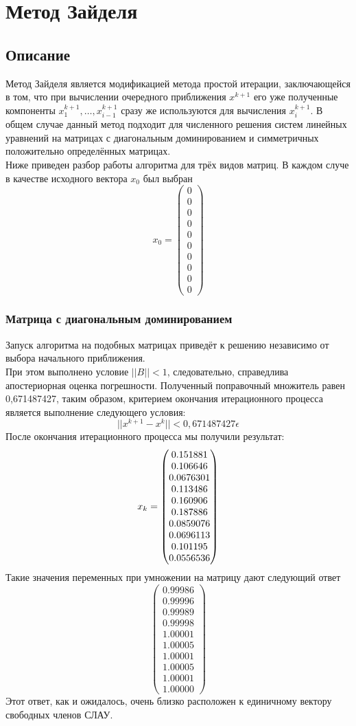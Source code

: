 \documentclass[../../report.tex]{subfiles}
\begin{document}
\chapter{Метод Зайделя}

\section{Описание}
Метод Зайделя является модификацией метода простой итерации, заключающейся в том, что при вычислении 
очередного приближения $x^{k+1}$ его уже полученные компоненты $x_1^{k+1},\dots,x_{i-1}^{k+1}$ сразу 
же используются для вычисления $x_i^{k+1}$. В общем случае данный метод подходит для численного решения 
систем линейных уравнений на матрицах с диагональным доминированием и симметричных положительно определённых матрицах. \\
Ниже приведен разбор работы алгоритма для трёх видов матриц. В каждом случе в качестве исходного вектора $x_0$ был выбран 
\[
x_0 = 
\begin{pmatrix} 
  0 \\ 
  0 \\ 
  0 \\ 
  0 \\ 
  0 \\ 
  0 \\ 
  0 \\ 
  0 \\ 
  0 \\ 
  0 
\end{pmatrix}
\]

\subsection{Матрица с диагональным доминированием}
Запуск алгоритма на подобных матрицах приведёт к 
решению независимо от выбора начального приближения. \\
При этом выполнено условие $||B|| < 1$, следовательно, справедлива апостериорная оценка погрешности. Полученный поправочный множитель равен 0,671487427, таким образом, критерием окончания итерационного процесса является выполнение следующего условия:
$$||x^{k+1} - x^k|| < 0,671487427\epsilon$$
После окончания итерационного процесса мы получили результат:
\[
x_k = \begin{pmatrix} 0.151881 \\ 0.106646 \\ 0.0676301 \\ 0.113486 \\ 0.160906 \\ 0.187886 \\ 0.0859076 \\ 0.0696113 \\ 0.101195 \\ 0.0556536 \end{pmatrix}
\]
Такие значения переменных при умножении на матрицу дают следующий ответ
\[
\begin{pmatrix}
  0.99986 \\
  0.99996 \\
  0.99989 \\
  0.99998 \\
  1.00001 \\
  1.00005 \\
  1.00001 \\
  1.00005 \\
  1.00001 \\
  1.00000
\end{pmatrix}
\]
Этот ответ, как и ожидалось, очень близко расположен к единичному вектору свободных членов СЛАУ.
\end{document}
